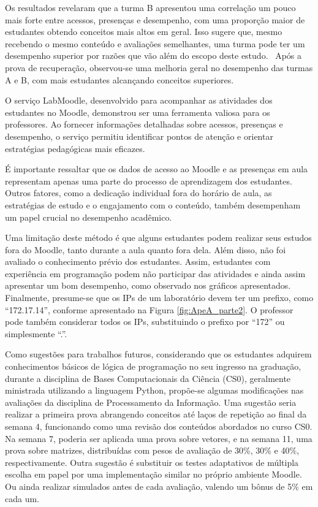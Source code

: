 Os resultados revelaram que a turma B apresentou uma correlação um pouco mais forte entre acessos, presenças e desempenho, com uma proporção maior de estudantes obtendo conceitos mais altos em geral. Isso sugere que, mesmo recebendo o mesmo conteúdo e avaliações semelhantes, uma turma pode ter um desempenho superior por razões que vão além do escopo deste estudo.
\
Após a prova de recuperação, observou-se uma melhoria geral no desempenho das turmas A e B, com mais estudantes alcançando conceitos superiores. 

O serviço LabMoodle, desenvolvido para acompanhar as atividades dos estudantes no Moodle, demonstrou ser uma ferramenta valiosa para os professores. Ao fornecer informações detalhadas sobre acessos, presenças e desempenho, o serviço permitiu identificar pontos de atenção e orientar estratégias pedagógicas mais eficazes.

É importante ressaltar que os dados de acesso ao Moodle e as presenças em aula representam apenas uma parte do processo de aprendizagem dos estudantes. Outros fatores, como a dedicação individual fora do horário de aula, as estratégias de estudo e o engajamento com o conteúdo, também desempenham um papel crucial no desempenho acadêmico.

Uma limitação deste método é que alguns estudantes podem realizar seus estudos fora do Moodle, tanto durante a aula quanto fora dela. Além disso, não foi avaliado o conhecimento prévio dos estudantes. Assim, estudantes com experiência em programação podem não participar das atividades e ainda assim apresentar um bom desempenho, como observado nos gráficos apresentados. Finalmente, presume-se que os IPs de um laboratório devem ter um prefixo, como ``172.17.14'', conforme apresentado na Figura \ref{fig:ApeA_parte2}. O professor pode também considerar todos os IPs, substituindo o prefixo por ``172'' ou simplesmente ``.''.

Como sugestões para trabalhos futuros, considerando que os estudantes adquirem conhecimentos básicos de lógica de programação no seu ingresso na graduação, durante a disciplina de Bases Computacionais da Ciência (CS0), geralmente ministrada utilizando a linguagem Python, propõe-se algumas modificações nas avaliações da disciplina de Processamento da Informação. Uma sugestão seria realizar a primeira prova abrangendo conceitos até laços de repetição ao final da semana 4, funcionando como uma revisão dos conteúdos abordados no curso CS0. Na semana 7, poderia ser aplicada uma prova sobre vetores, e na semana 11, uma prova sobre matrizes, distribuídas com pesos de avaliação de 30\%, 30\% e 40\%, respectivamente. Outra sugestão é substituir os testes adaptativos de múltipla escolha em papel por uma implementação similar no próprio ambiente Moodle. Ou ainda realizar simulados antes de cada avaliação, valendo um bônus de 5\% em cada um.

